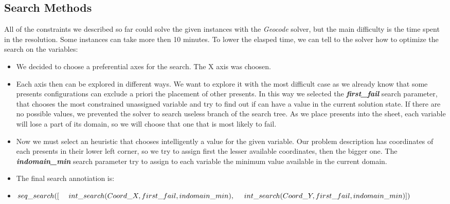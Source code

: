 \subsection{Search Methods}
All of the constraints we described so far could solve the given instances with the \textit{Geocode} solver,
but the main difficulty is the time spent in the resolution. Some instances can take more then 10 minutes.
To lower the elasped time, we can tell to the solver how to optimize the search on the variables:
\begin{itemize}
    \item We decided to choose a preferential axes for the search. The X axis was choosen.
    \item Each axis then can be explored in different ways. We want to explore it with the most difficult case
        as we already know that some presents configurations can exclude a priori the placement of other presents.
        In this way we selected the \textit{\textbf{first\_fail}} search parameter, that chooses the most constrained
        unassigned variable and try to find out if can have a value in the current solution state.
        If there are no possible values, we prevented the solver to search useless branch of the search tree.
        As we place presents into the sheet, each variable will lose a part of its domain, so we will choose that
        one that is most likely to fail.
    \item Now we must select an heuristic that chooses intelligently a value for the given variable. Our problem
        description has coordinates of each presents in their lower left corner, so we try to assign first the lesser
        available coordinates, then the bigger one. The \textit{\textbf{indomain\_min}} search parameter try to assign
        to each variable the minimum value available in the current domain.
    \item The final search annotiation is:
    \item[] $seq\_search([\\
            \text{\ \ \ \ }int\_search(Coord\_X, first\_fail, indomain\_min),\\
            \text{\ \ \ \ }int\_search(Coord\_Y, first\_fail, indomain\_min)\\
        ])$
\end{itemize} 

